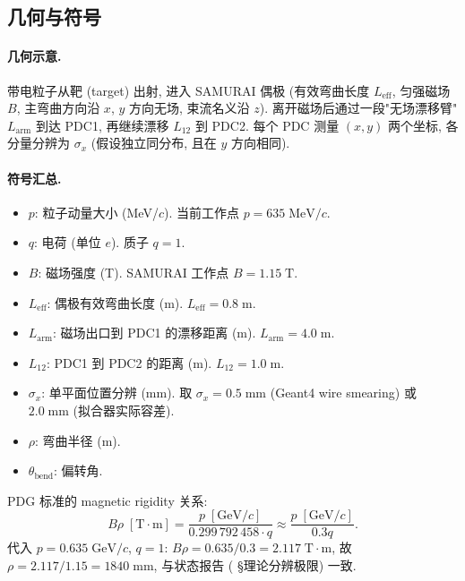 \subsection{几何与符号}

\paragraph{几何示意.} 带电粒子从靶 (target) 出射, 进入 SAMURAI 偶极 (有效弯曲长度 $L_\mathrm{eff}$, 匀强磁场 $B$, 主弯曲方向沿 $x$, $y$ 方向无场, 束流名义沿 $z$). 离开磁场后通过一段"无场漂移臂" $L_\mathrm{arm}$ 到达 PDC1, 再继续漂移 $L_{12}$ 到 PDC2. 每个 PDC 测量 $(x, y)$ 两个坐标, 各分量分辨为 $\sigma_x$ (假设独立同分布, 且在 $y$ 方向相同).

\paragraph{符号汇总.}
\begin{itemize}[nosep, leftmargin=2em]
  \item $p$: 粒子动量大小 (MeV/$c$). 当前工作点 $p = 635\;\mathrm{MeV}/c$.
  \item $q$: 电荷 (单位 $e$). 质子 $q = 1$.
  \item $B$: 磁场强度 (T). SAMURAI 工作点 $B = 1.15\;\mathrm{T}$.
  \item $L_\mathrm{eff}$: 偶极有效弯曲长度 (m). $L_\mathrm{eff} = 0.8\;\mathrm{m}$.
  \item $L_\mathrm{arm}$: 磁场出口到 PDC1 的漂移距离 (m). $L_\mathrm{arm} = 4.0\;\mathrm{m}$.
  \item $L_{12}$: PDC1 到 PDC2 的距离 (m). $L_{12} = 1.0\;\mathrm{m}$.
  \item $\sigma_x$: 单平面位置分辨 (mm). 取 $\sigma_x = 0.5\;\mathrm{mm}$ (Geant4 wire smearing) 或 $2.0\;\mathrm{mm}$ (拟合器实际容差).
  \item $\rho$: 弯曲半径 (m).
  \item $\theta_\mathrm{bend}$: 偏转角.
\end{itemize}

PDG 标准的 magnetic rigidity 关系:
\begin{equation}
  B \rho \;[\mathrm{T \cdot m}] = \frac{p\;[\mathrm{GeV}/c]}{0.299\,792\,458 \cdot q}
  \approx \frac{p\;[\mathrm{GeV}/c]}{0.3 q}.
  \label{eq:partIc:Brho}
\end{equation}
代入 $p = 0.635\;\mathrm{GeV}/c$, $q = 1$: $B\rho = 0.635 / 0.3 = 2.117\;\mathrm{T \cdot m}$, 故 $\rho = 2.117 / 1.15 = 1840\;\mathrm{mm}$, 与状态报告 (\StatusReport{} §理论分辨极限) 一致.

